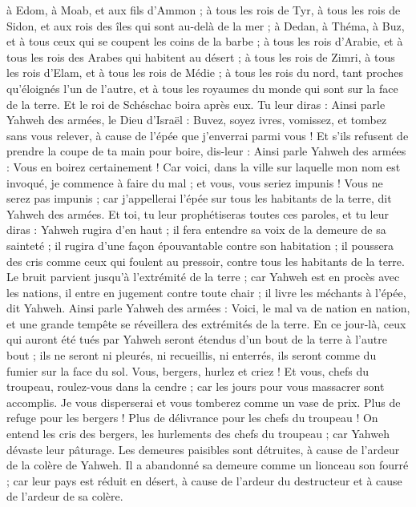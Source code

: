 \begin{multicols}{2}
à Edom, à Moab, et aux fils d'Ammon ;
à tous les rois de Tyr, à tous les rois de Sidon, et aux rois des îles qui sont au-delà de la mer ;
à Dedan, à Théma, à Buz, et à tous ceux qui se coupent les coins de la barbe ;
à tous les rois d'Arabie, et à tous les rois des Arabes qui habitent au désert ;
à tous les rois de Zimri, à tous les rois d'Elam, et à tous les rois de Médie ;
à tous les rois du nord, tant proches qu'éloignés l'un de l'autre, et à tous les royaumes du monde qui sont sur la face de la terre. Et le roi de Schéschac boira après eux.
Tu leur diras : Ainsi parle Yahweh des armées, le Dieu d'Israël : Buvez, soyez ivres, vomissez, et tombez sans vous relever, à cause de l'épée que j'enverrai parmi vous !
Et s'ils refusent de prendre la coupe de ta main pour boire, dis-leur : Ainsi parle Yahweh des armées : Vous en boirez certainement !
Car voici, dans la ville sur laquelle mon nom est invoqué, je commence à faire du mal ; et vous, vous seriez impunis ! Vous ne serez pas impunis ; car j'appellerai l'épée sur tous les habitants de la terre, dit Yahweh des armées.
Et toi, tu leur prophétiseras toutes ces paroles, et tu leur diras : Yahweh rugira d'en haut ; il fera entendre sa voix de la demeure de sa sainteté ; il rugira d'une façon épouvantable contre son habitation ; il poussera des cris comme ceux qui foulent au pressoir, contre tous les habitants de la terre.
Le bruit parvient jusqu'à l'extrémité de la terre ; car Yahweh est en procès avec les nations, il entre en jugement contre toute chair ; il livre les méchants à l'épée, dit Yahweh.
Ainsi parle Yahweh des armées : Voici, le mal va de nation en nation, et une grande tempête se réveillera des extrémités de la terre.
En ce jour-là, ceux qui auront été tués par Yahweh seront étendus d'un bout de la terre à l'autre bout ; ils ne seront ni pleurés, ni recueillis, ni enterrés, ils seront comme du fumier sur la face du sol.
Vous, bergers, hurlez et criez ! Et vous, chefs du troupeau, roulez-vous dans la cendre ; car les jours pour vous massacrer sont accomplis. Je vous disperserai et vous tomberez comme un vase de prix.
Plus de refuge pour les bergers ! Plus de délivrance pour les chefs du troupeau !
On entend les cris des bergers, les hurlements des chefs du troupeau ; car Yahweh dévaste leur pâturage.
Les demeures paisibles sont détruites, à cause de l'ardeur de la colère de Yahweh.
Il a abandonné sa demeure comme un lionceau son fourré ; car leur pays est réduit en désert, à cause de l'ardeur du destructeur et à cause de l'ardeur de sa colère.

\end{multicols}
